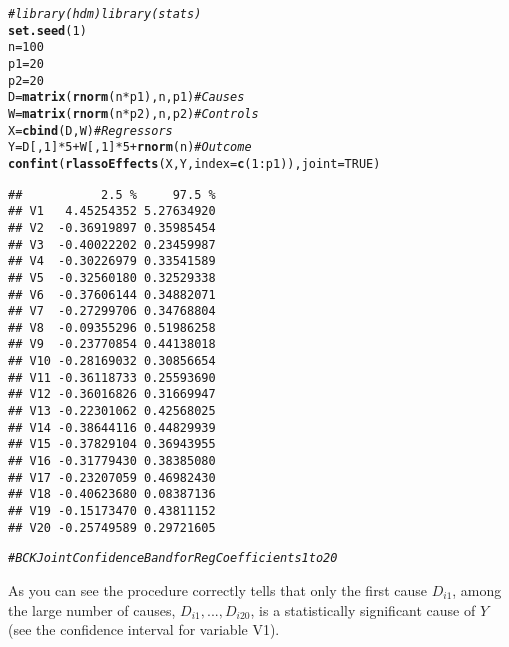 \documentclass{amsart}\usepackage[]{graphicx}\usepackage[]{color}
\makeatletter
\newcommand{\hlnum}[1]{\textcolor[rgb]{0.686,0.059,0.569}{#1}}%
\newcommand{\hlcom}[1]{\textcolor[rgb]{0.678,0.584,0.686}{\textit{#1}}}%
\newcommand{\hlopt}[1]{\textcolor[rgb]{0,0,0}{#1}}%
\newcommand{\hlstd}[1]{\textcolor[rgb]{0.345,0.345,0.345}{#1}}%
\newcommand{\hlkwb}[1]{\textcolor[rgb]{0.69,0.353,0.396}{#1}}%
\newcommand{\hlkwc}[1]{\textcolor[rgb]{0.333,0.667,0.333}{#1}}%
\newcommand{\hlkwd}[1]{\textcolor[rgb]{0.737,0.353,0.396}{\textbf{#1}}}%
\newenvironment{kframe}{%
 \def\at@end@of@kframe{}%
 \ifinner\ifhmode%
  \def\at@end@of@kframe{\end{minipage}}%
  \begin{minipage}{\columnwidth}%
 \fi\fi%
 \def\FrameCommand##1{\hskip\@totalleftmargin \hskip-\fboxsep
 \colorbox{shadecolor}{##1}\hskip-\fboxsep
     \hskip-\linewidth \hskip-\@totalleftmargin \hskip\columnwidth}%
 \MakeFramed {\advance\hsize-\width
   \@totalleftmargin\z@ \linewidth\hsize
   \@setminipage}}%
 {\par\unskip\endMakeFramed%
 \at@end@of@kframe}
\newenvironment{knitrout}{}{} %
\makeatother
\begin{document}
\begin{knitrout}
\color{fgcolor}\begin{kframe}
\begin{alltt}
\hlcom{# library(hdm) library(stats)}
\hlkwd{set.seed}\hlstd{(}\hlnum{1}\hlstd{)}
\hlstd{n} \hlkwb{=} \hlnum{100}
\hlstd{p1} \hlkwb{=} \hlnum{20}
\hlstd{p2} \hlkwb{=} \hlnum{20}
\hlstd{D} \hlkwb{=} \hlkwd{matrix}\hlstd{(}\hlkwd{rnorm}\hlstd{(n} \hlopt{*} \hlstd{p1), n, p1)}  \hlcom{# Causes}
\hlstd{W} \hlkwb{=} \hlkwd{matrix}\hlstd{(}\hlkwd{rnorm}\hlstd{(n} \hlopt{*} \hlstd{p2), n, p2)}  \hlcom{# Controls}
\hlstd{X} \hlkwb{=} \hlkwd{cbind}\hlstd{(D, W)}  \hlcom{# Regressors}
\hlstd{Y} \hlkwb{=} \hlstd{D[,} \hlnum{1}\hlstd{]} \hlopt{*} \hlnum{5} \hlopt{+} \hlstd{W[,} \hlnum{1}\hlstd{]} \hlopt{*} \hlnum{5} \hlopt{+} \hlkwd{rnorm}\hlstd{(n)}  \hlcom{#Outcome}
\hlkwd{confint}\hlstd{(}\hlkwd{rlassoEffects}\hlstd{(X, Y,} \hlkwc{index} \hlstd{=} \hlkwd{c}\hlstd{(}\hlnum{1}\hlopt{:}\hlstd{p1)),} \hlkwc{joint} \hlstd{=} \hlnum{TRUE}\hlstd{)}
\end{alltt}
\begin{verbatim}
##           2.5 %     97.5 %
## V1   4.45254352 5.27634920
## V2  -0.36919897 0.35985454
## V3  -0.40022202 0.23459987
## V4  -0.30226979 0.33541589
## V5  -0.32560180 0.32529338
## V6  -0.37606144 0.34882071
## V7  -0.27299706 0.34768804
## V8  -0.09355296 0.51986258
## V9  -0.23770854 0.44138018
## V10 -0.28169032 0.30856654
## V11 -0.36118733 0.25593690
## V12 -0.36016826 0.31669947
## V13 -0.22301062 0.42568025
## V14 -0.38644116 0.44829939
## V15 -0.37829104 0.36943955
## V16 -0.31779430 0.38385080
## V17 -0.23207059 0.46982430
## V18 -0.40623680 0.08387136
## V19 -0.15173470 0.43811152
## V20 -0.25749589 0.29721605
\end{verbatim}
\begin{alltt}
\hlcom{# BCK Joint Confidence Band for Reg Coefficients 1 to 20}
\end{alltt}
\end{kframe}
\end{knitrout}
As you can see the procedure correctly tells that only
the first cause $D_{i1}$, among the large number of causes, $D_{i1},..., D_{i20}$,  is a statistically significant cause of $Y$ (see the confidence interval for variable V1).


\end{document}
